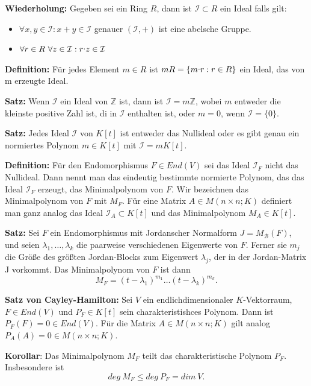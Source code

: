 \documentclass{article}
\let\oldcdot\cdot
\renewcommand{\cdot}{\raisebox{0.1ex}{$\oldcdot$}}
\begin{document}
\textbf{Wiederholung:} Gegeben sei ein Ring $R$, dann ist $\mathcal{I} \subset
R$ ein Ideal falls gilt:

\begin{itemize}
\item[i)] $\forall x,y\in \mathcal{I}: x+y\in\mathcal{I}$ genauer
	$(\mathcal{I},+)$ ist eine abelsche Gruppe.
\item[ii)] $\forall r\in R\ \forall z\in\mathcal{I}: r\cdot z\in\mathcal{I}$
\end{itemize}

\textbf{Definition:} Für jedes Element $m\in R$ ist $mR=\{m\cdot r: r\in R\}$
ein Ideal, das von m erzeugte Ideal.

\textbf{Satz:} Wenn $\mathcal{I}$ ein Ideal von $\mathbb{Z}$ ist, dann ist
$\mathcal{I}=m\mathbb{Z}$, wobei $m$ entweder die kleinste positive Zahl ist,
di in $\mathcal{I}$ enthalten ist, oder $m=0$, wenn $\mathcal{I}=\{0\}$.

\textbf{Satz:} Jedes Ideal $\mathcal{I}$ von $K[t]$ ist entweder das Nullideal
oder es gibt genau ein normiertes Polynom $m\in K[t]$ mit $\mathcal{I}=mK[t]$.

\newpage
\textbf{Definition:} Für den Endomorphismus $F\in End(V)$ sei das Ideal
$\mathcal{I}_F$ nicht das Nullideal. Dann nennt man das eindeutig bestimmte
normierte Polynom, das das Ideal $\mathcal{I}_F$ erzeugt, das Minimalpolynom
von $F$. Wir bezeichnen das Minimalpolynom von $F$ mit $M_F$. Für eine Matrix
$A\in M(n\times n;K)$ definiert man ganz analog das Ideal $\mathcal{I}_A\subset
K[t]$ und das Minimalpolynom $M_A\in K[t]$.

\textbf{Satz:} Sei $F$ ein Endomorphismus mit Jordanscher Normalform
$J=M_\mathcal{B}(F)$, und seien $\lambda_1, \dots, \lambda_k$ die paarweise
verschiedenen Eigenwerte von $F$. Ferner sie $m_j$ die Größe des größten
Jordan-Blocks zum Eigenwert $\lambda_j$, der in der Jordan-Matrix J vorkommt.
Das Minimalpolynom von $F$ ist dann
\begin{equation*}
	M_F=(t-\lambda_1)^{m_1}\dots(t-\lambda_k)^{m_k}.
\end{equation*}

\textbf{Satz von Cayley-Hamilton:} Sei $V$ ein endlichdimensionaler
$K$-Vektorraum, $F\in End(V)$ und $P_F\in K[t]$ sein charakteristishces
Polynom. Dann ist $P_F(F)=0\in End(V)$. Für die Matrix $A\in M(n\times n;K)$
gilt analog $P_A(A)=0\in M(n\times n;K)$.

\textbf{Korollar}: Das Minimalpolynom $M_F$ teilt das charakteristische Polynom
$P_F$. Insbesondere ist 
\begin{equation*}
	deg\ M_F\leq deg\ P_F=dim\ V.
\end{equation*}
\end{document}
